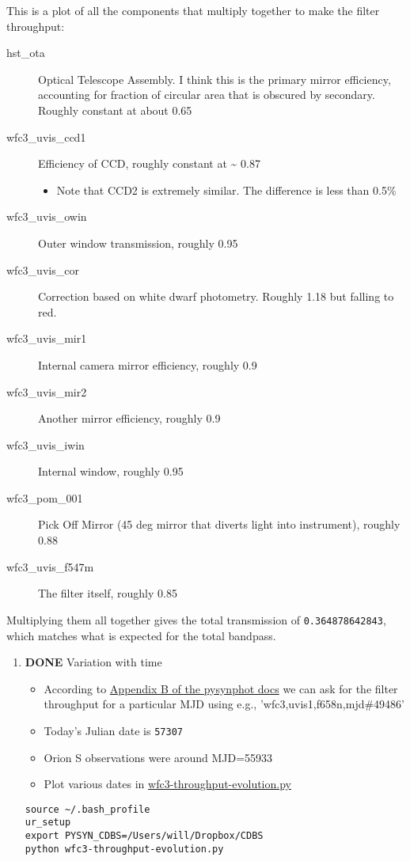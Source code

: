 \documentclass[11pt]{article}
\begin{document}
\begin{enumerate}
This is a plot of all the components that multiply together to make the filter throughput:
\begin{description}
\item[{hst\_ota}] Optical Telescope Assembly.  I think this is the primary mirror efficiency, accounting for fraction of circular area that is obscured by secondary. Roughly constant at about 0.65
\item[{wfc3\_uvis\_ccd1}] Efficiency of CCD, roughly constant at \textasciitilde{} 0.87
\begin{itemize}
\item Note that CCD2 is extremely similar.  The difference is less than 0.5\%
\end{itemize}
\item[{wfc3\_uvis\_owin}] Outer window transmission, roughly 0.95
\item[{wfc3\_uvis\_cor}] Correction based on white dwarf photometry. Roughly 1.18 but falling to red.
\item[{wfc3\_uvis\_mir1}] Internal camera mirror efficiency, roughly 0.9
\item[{wfc3\_uvis\_mir2}] Another mirror efficiency, roughly 0.9
\item[{wfc3\_uvis\_iwin}] Internal window, roughly 0.95
\item[{wfc3\_pom\_001}] Pick Off Mirror (45 deg mirror that diverts light into instrument), roughly 0.88
\item[{wfc3\_uvis\_f547m}] The filter itself, roughly 0.85
\end{description}

Multiplying them all together gives the total transmission of \texttt{0.364878642843}, which matches what is expected for the total bandpass.


\begin{enumerate}
\item {\bfseries\sffamily DONE} Variation with time
\label{sec:orgheadline18}
\begin{itemize}
\item According to \href{http://ssb.stsci.edu/pysynphot/docs/appendixb.html#pysynphot-appendixb}{Appendix B of the pysynphot docs} we can ask for the filter throughput for a particular MJD using e.g., 'wfc3,uvis1,f658n,mjd\#49486'
\item Today's Julian date is \texttt{57307}
\item Orion S observations were around MJD=55933
\item Plot various dates in \url{wfc3-throughput-evolution.py}
\end{itemize}
\begin{verbatim}
source ~/.bash_profile
ur_setup
export PYSYN_CDBS=/Users/will/Dropbox/CDBS
python wfc3-throughput-evolution.py
\end{verbatim}


\end{enumerate}
\end{enumerate}
\end{document}
